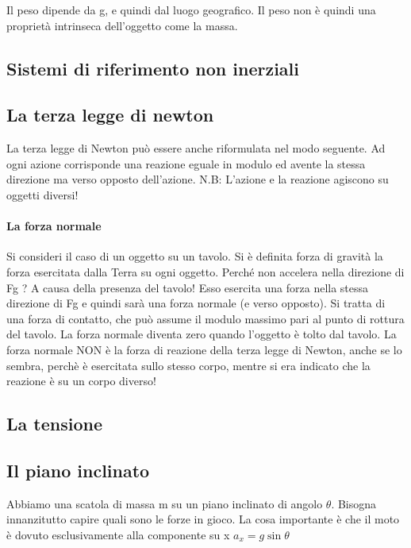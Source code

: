 \documentclass[12pt, a4paper, openany]{book}
\begin{document}
Il peso dipende da g, e quindi dal luogo geografico. Il peso non è quindi una proprietà intrinseca
dell’oggetto come la massa.
\subsection*{Sistemi di riferimento non inerziali}
\subsection{La terza legge di newton}
La terza legge di Newton può essere anche riformulata nel modo seguente.
Ad ogni azione corrisponde una reazione eguale in modulo ed avente la stessa direzione ma
verso opposto dell’azione.
N.B: L’azione e la reazione agiscono su oggetti diversi!

\paragraph*{La forza normale}
Si consideri il caso di un oggetto su un tavolo. Si è definita forza di gravità la forza esercitata dalla Terra su
ogni oggetto. Perché non accelera nella direzione di Fg ? A causa della presenza del tavolo!
Esso esercita una forza nella stessa direzione di Fg e quindi sarà una forza normale (e verso opposto). Si
tratta di una forza di contatto, che può assume il modulo massimo pari al punto di rottura del tavolo. La
forza normale diventa zero quando l'oggetto è tolto dal tavolo.
La forza normale NON è la forza di reazione della terza legge di Newton, anche se lo sembra,
perchè è esercitata sullo stesso corpo, mentre si era indicato che la reazione è su un corpo
diverso!

\subsection*{La tensione}

\subsection{Il piano inclinato} %
Abbiamo una scatola di massa m su un piano inclinato di angolo $\theta$. 
Bisogna innanzitutto capire quali sono le forze in gioco.
La cosa importante è che il moto è dovuto esclusivamente alla componente su x %
$a_x = g \sin \theta$
\end{document}
